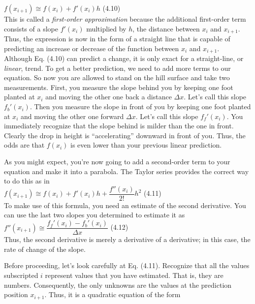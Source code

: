 \documentclass[../main.tex]{subfiles}
\begin{document}
$f(x_{i+1})\cong f(x_i)+f'(x_i)h$
\hfill
(4.10)\\

\noindent
This is called a \emph{first-order approximation} because the additional first-order term consists of
a slope $f'(x_i)$ multiplied by $h$, the distance between $x_i$ and $x_{i+1}$. Thus, the expression is
now in the form of a straight line that is capable of predicting an increase or decrease of the
function between $x_i$ and $x_{i+1}$.\\

Although Eq. (4.10) can predict a change, it is only exact for a straight-line, or \emph{linear},
trend. To get a better prediction, we need to add more terms to our equation. So now you
are allowed to stand on the hill surface and take two measurements. First, you measure the
slope behind you by keeping one foot planted at $x_i$ and moving the other one back a distance
$\Delta x$. Let's call this slope $f_b'(x_i)$. Then you measure the slope in front of you by keeping
one foot planted at $x_i$ and moving the other one forward $\Delta x$. Let's call this slope
$f_f'(x_i)$. You immediately recognize that the slope behind is milder than the one in front.
Clearly the drop in height is ``accelerating'' downward in front of you. Thus, the odds are
that $f(x_i)$ is even lower than your previous linear prediction.

As you might expect, you're now going to add a second-order term to your equation
and make it into a parabola. The Taylor series provides the correct way to do this as in\\

$f(x_{i+1})\cong f(x_i)+f'(x_i)h+\dfrac{f''(x_i)}{2!}h^2$
\hfill
(4.11)\\

\noindent
To make use of this formula, you need an estimate of the second derivative. You can use the
last two slopes you determined to estimate it as\\

$f''(x_{i+1})\cong\dfrac{f_f'(x_i)-f_b'(x_i)}{\Delta x}$
\hfill
(4.12)\\

\noindent
Thus, the second derivative is merely a derivative of a derivative; in this case, the rate of
change of the slope.

Before proceeding, let's look carefully at Eq. (4.11). Recognize that all the values
subscripted $i$ represent values that you have estimated. That is, they are numbers. Consequently,
the only unknowns are the values at the prediction position $x_{i+1}$. Thus, it is a quadratic
equation of the form\\
\end{document}
